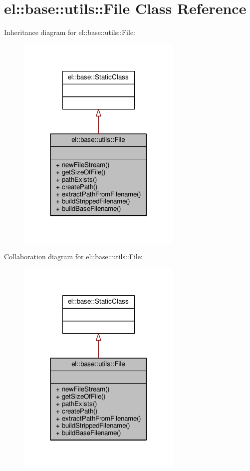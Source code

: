 \hypertarget{classel_1_1base_1_1utils_1_1File}{}\section{el\+:\+:base\+:\+:utils\+:\+:File Class Reference}
\label{classel_1_1base_1_1utils_1_1File}


Inheritance diagram for el\+:\+:base\+:\+:utils\+:\+:File\+:
\nopagebreak
\begin{figure}[H]
\begin{center}
\leavevmode
\includegraphics[width=224pt]{d6/d96/classel_1_1base_1_1utils_1_1File__inherit__graph}
\end{center}
\end{figure}


Collaboration diagram for el\+:\+:base\+:\+:utils\+:\+:File\+:
\nopagebreak
\begin{figure}[H]
\begin{center}
\leavevmode
\includegraphics[width=224pt]{da/d7a/classel_1_1base_1_1utils_1_1File__coll__graph}
\end{center}
\end{figure}
